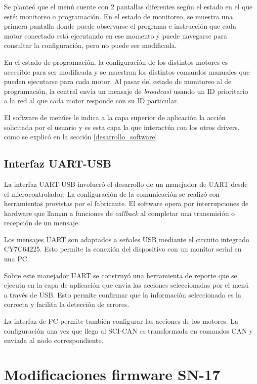 Se planteó que el menú cuente con 2 pantallas diferentes según el estado en el que esté: monitoreo o programación. En el estado de monitoreo, se muestra una primera pantalla donde puede observarse el programa e instrucción que cada motor conectado está ejecutando en ese momento y puede navegarse para consultar la configuración, pero no puede ser modificada.

En el estado de programación, la configuración de los distintos motores es accesible para ser modificada y se muestran los distintos comandos manuales que pueden ejecutarse para cada motor. Al pasar del estado de monitoreo al de programación, la central envía un mensaje de \textit{broadcast} usando un ID prioritario a la red al que cada motor responde con su ID particular.

El software de menúes le indica a la capa superior de aplicación la acción solicitada por el usuario y es esta capa la que interactúa con los otros drivers, como se explicó en la sección \ref{desarrollo_software}.

\subsection{Interfaz UART-USB}

La interfaz UART-USB involucró el desarrollo de un manejador de UART desde el microcontrolador. La configuración de la comunicación se realizó con herramientas provistas por el fabricante. El software opera por interrupciones de hardware que llaman a funciones de \textit{callback} al completar una transmisión o recepción de un mensaje.

Los mensajes UART son adaptados a señales USB mediante el circuito integrado CY7C64225\citep{web_interfaz_USB_UART}. Esto permite la conexión del dispositivo con un monitor serial en una PC.

Sobre este manejador UART se construyó una herramienta de reporte que se ejecuta en la capa de aplicación que envía las acciones seleccionadas por el menú a través de USB. Esto permite confirmar que la información seleccionada es la correcta y facilita la detección de errores.

La interfaz de PC permite también configurar las acciones de los motores. La configuración una vez que llega al SCI-CAN es transformada en comandos CAN y enviada al nodo correspondiente.

\section{Modificaciones firmware SN-17}


